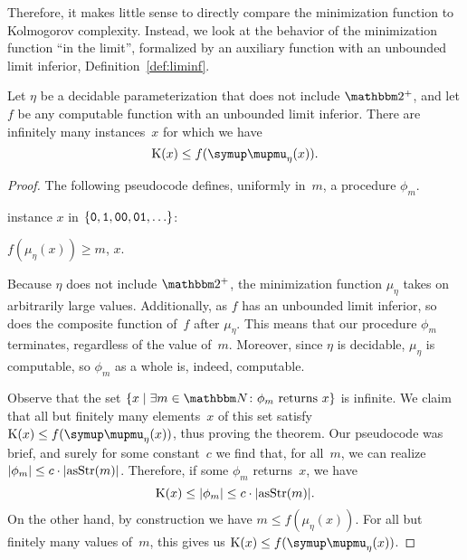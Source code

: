 Therefore, it makes little sense to directly compare the minimization function to Kolmogorov complexity.
Instead, we look at the behavior of the minimization function \enquote{in the limit}, formalized by an auxiliary function with an unbounded limit inferior, Definition~\ref{def:liminf}.
\begin{theorem}
\label{thm:parameterizedicc}%
  Let $\eta$ be a decidable parameterization that does not include $\binary^+$, and let $f$ be any computable function with an unbounded limit inferior.
  There are infinitely many instances~$x$ for which we have
  \begin{equation*}
    \KC(x) \le f(\mu_\eta(x)).
  \end{equation*}
\end{theorem}
\begin{proof}
  The following pseudocode defines, uniformly in~$m$, a procedure $\phi_m$.
  \begin{codelisting}
  \item
     instance $x$ in $\{\bits{0}, \bits{1}, \bits{00}, \bits{01}, \ldots\}$:
    \begin{codelisting}
      \item {} $f(\mu_\eta(x)) \ge m$,  $x$.
    \end{codelisting}
  \end{codelisting}

  Because $\eta$ does not include $\binary^+$, the minimization function $\mu_\eta$ takes on arbitrarily large values.
  Additionally, as $f$ has an unbounded limit inferior, so does the composite function of~$f$ after $\mu_\eta$.
  This means that our procedure $\phi_m$ terminates, regardless of the value of~$m$.
  Moreover, since $\eta$ is decidable, $\mu_\eta$ is computable, so $\phi_m$ as a whole is, indeed, computable.

  Observe that the set $\{x \st \exists m \in \bbN\colon \text{$\phi_m$ returns $x$}\}$ is infinite.
  We claim that all but finitely many elements~$x$ of this set satisfy $\KC(x) \le f(\mu_\eta(x))$, thus proving the theorem.
  Our pseudocode was brief, and surely for some constant~$c$ we find that, for all~$m$, we can realize ${\lvert\phi_m\rvert} \le c \cdot {\lvert\operatorname{asStr}(m)\rvert}$.
  Therefore, if some $\phi_m$ returns~$x$, we have
  \begin{equation*}
    \operatorname{K}(x) \le {\lvert\phi_m\rvert} \le c \cdot {\lvert\operatorname{asStr}(m)\rvert}.
  \end{equation*}
  On the other hand, by construction we have $m \le f(\mu_\eta(x))$.
  For all but finitely many values of~$m$, this gives us $\KC(x) \le f(\mu_\eta(x))$.
\end{proof}

